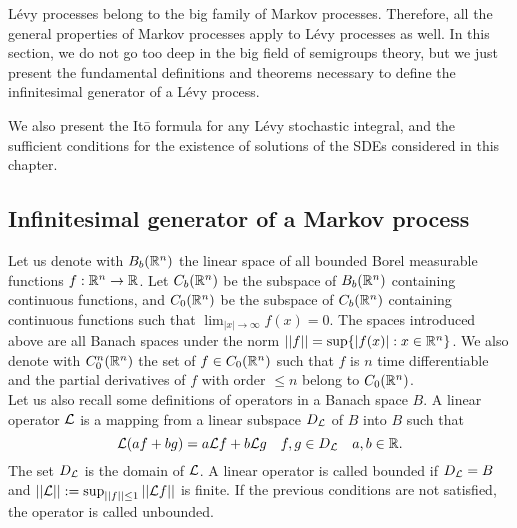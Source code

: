 Lévy processes belong to the big family of Markov processes. Therefore, all the general properties of Markov processes apply to
Lévy processes as well.
In this section,
we do not go too deep in the big field of semigroups theory, but we just present the fundamental definitions and 
theorems necessary to define the infinitesimal generator of a Lévy process.

We also present the It\={o} formula for any Lévy stochastic integral, and the sufficient conditions for the existence of solutions of the SDEs 
considered in this chapter. 


\subsection{Infinitesimal generator of a Markov process}


Let us denote with $B_b(\mathbb{R}^n)$ 
the linear space of all bounded Borel measurable functions $f: \mathbb{R}^n \to \mathbb{R}$. 
Let $C_b(\mathbb{R}^n)$ be the subspace of $B_b(\mathbb{R}^n)$ containing continuous functions, and
$C_0(\mathbb{R}^n)$ be the subspace of $C_b(\mathbb{R}^n)$ containing continuous functions such that $\lim_{|x|\to \infty} f(x) = 0$.
The spaces introduced above are all Banach spaces under the norm $||f|| = \sup\{ |f(x)| : x\in \mathbb{R}^n \}$.
We also denote with $C_0^{n}(\mathbb{R}^n)$ the set of $f \in C_0(\mathbb{R}^n)$ such that $f$ is $n$ time differentiable and 
the partial derivatives of $f$ with order $\leq n$ belong to $C_0(\mathbb{R}^n)$.  \\
Let us also recall some definitions of operators in a Banach space $B$.
A linear operator $\mathcal{L}$ is a mapping from a linear subspace $D_{\mathcal{L}}$ of $B$ into $B$ such that 
$$ \mathcal{L} ( af + bg ) = a \mathcal{L} f + b \mathcal{L} g  \quad f,g \in D_{\mathcal{L}} \quad a,b \in \mathbb{R}. $$
The set $D_{\mathcal{L}}$ is the domain of $\mathcal{L}$. A linear operator is called bounded if $D_{\mathcal{L}} = B$ and $||\mathcal{L}|| := \sup_{||f||\leq 1} ||\mathcal{L} f||$ is finite.
If the previous conditions are not satisfied, the operator is called unbounded.

